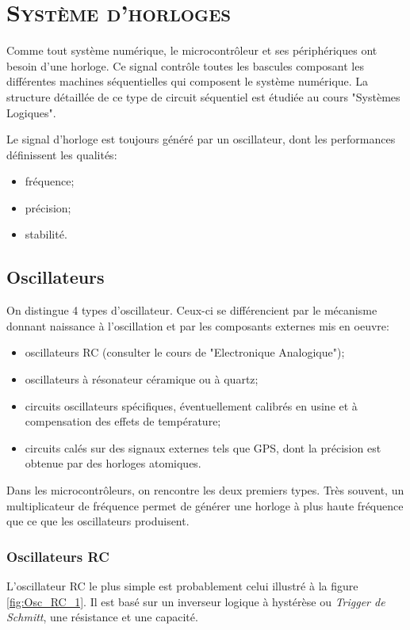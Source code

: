 \chapter{\textsc{Système d'horloges}}

Comme tout système numérique, le microcontrôleur et ses périphériques ont besoin d'une horloge. Ce signal contrôle toutes les bascules composant les différentes machines séquentielles qui composent le système numérique. La structure détaillée de ce type de circuit séquentiel est étudiée au cours "Systèmes Logiques".

Le signal d'horloge est toujours généré par un oscillateur, dont les performances définissent les qualités:
\begin{itemize}[label=\textbullet,font=\small]
\item fréquence;
\item précision;
\item stabilité.
\end{itemize}

\section{Oscillateurs}
On distingue 4 types d'oscillateur. Ceux-ci se différencient par le mécanisme donnant naissance à l'oscillation et par les composants externes mis en oeuvre:
\begin{itemize}[label=\textbullet,font=\small]
\item oscillateurs RC (consulter le cours de "Electronique Analogique");
\item oscillateurs à résonateur céramique ou à quartz;
\item circuits oscillateurs spécifiques, éventuellement calibrés en usine et à compensation des effets de température;
\item circuits calés sur des signaux externes tels que GPS, dont la précision est obtenue par des horloges atomiques.
\end{itemize}

Dans les microcontrôleurs, on rencontre les deux premiers types.
Très souvent, un multiplicateur de fréquence permet de générer une horloge à plus haute fréquence que ce que les oscillateurs produisent.

\subsection{Oscillateurs RC}
L'oscillateur RC le plus simple est probablement celui illustré à la figure \ref{fig:Osc_RC_1}. Il est basé sur un inverseur logique à hystérèse ou \textit{Trigger de Schmitt}, une résistance et une capacité.

